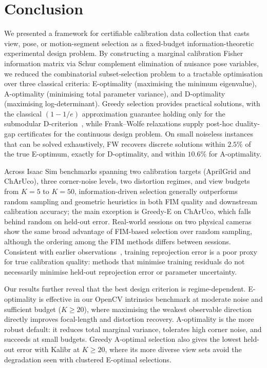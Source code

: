 \documentclass[letterpaper, 9
 pt, conference]{ieeeconf}
\begin{document}
\section{Conclusion}
\label{sec:conclusion}

We presented a framework for certifiable calibration data collection that
casts view, pose, or motion-segment selection as a fixed-budget
information-theoretic experimental design problem.
By constructing a marginal calibration Fisher information matrix via Schur
complement elimination of nuisance pose variables, we reduced the combinatorial
subset-selection problem to a tractable optimisation over three classical
criteria: E-optimality (maximising the minimum eigenvalue), A-optimality
(minimising total parameter variance), and D-optimality (maximising
log-determinant).
Greedy selection provides practical solutions, with the classical
$(1-1/e)$ approximation guarantee holding only for the submodular D-criterion~\citep{krause2008near,bian2017guarantees},
while Frank--Wolfe relaxations supply post-hoc duality-gap certificates for the
continuous design problem. On small noiseless instances that can be solved
exhaustively, FW recovers discrete solutions within $2.5\%$ of the true
E-optimum, exactly for D-optimality, and within $10.6\%$ for A-optimality.

Across Isaac Sim benchmarks spanning two calibration targets
(AprilGrid and ChArUco), three corner-noise levels, two distortion regimes,
and view budgets from $K{=}5$ to $K{=}50$, information-driven selection
generally outperforms random sampling and geometric heuristics in both
FIM quality and downstream calibration accuracy; the main exception is
Greedy-E on ChArUco, which falls behind random on held-out error.
Real-world sessions on two physical cameras show the same broad advantage
of FIM-based selection over random sampling, although the ordering among
the FIM methods differs between sessions.
Consistent with earlier observations~\citep{richardson2013aprilcal,peng2019calibration},
training reprojection error is a poor proxy for true
calibration quality: methods that minimise training residuals do not
necessarily minimise held-out reprojection error or parameter uncertainty.

Our results further reveal that the best design criterion is
regime-dependent.
E-optimality is effective in our OpenCV intrinsics benchmark at
moderate noise and sufficient budget ($K{\ge}20$), where maximising the weakest observable direction directly improves
focal-length and distortion recovery.
A-optimality is the more robust default: it reduces total marginal variance,
tolerates high corner noise, and succeeds at small budgets. Greedy
A-optimal selection also gives the lowest held-out error with Kalibr at
$K{\ge}20$, where its more diverse view sets avoid the degradation seen
with clustered E-optimal selections.
\end{document}
